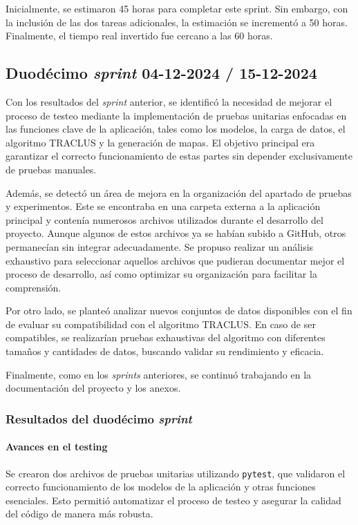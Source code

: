 Inicialmente, se estimaron 45 horas para completar este sprint. Sin embargo, con la inclusión de las dos tareas adicionales, la estimación se incrementó a 50 horas. Finalmente, el tiempo real invertido fue cercano a las 60 horas.


\subsection{Duodécimo \textit{sprint} 04-12-2024 / 15-12-2024}

Con los resultados del \textit{sprint} anterior, se identificó la necesidad de mejorar el proceso de testeo mediante la implementación de pruebas unitarias enfocadas en las funciones clave de la aplicación, tales como los modelos, la carga de datos, el algoritmo TRACLUS y la generación de mapas. El objetivo principal era garantizar el correcto funcionamiento de estas partes sin depender exclusivamente de pruebas manuales.

Además, se detectó un área de mejora en la organización del apartado de pruebas y experimentos. Este se encontraba en una carpeta externa a la aplicación principal y contenía numerosos archivos utilizados durante el desarrollo del proyecto. Aunque algunos de estos archivos ya se habían subido a GitHub, otros permanecían sin integrar adecuadamente. Se propuso realizar un análisis exhaustivo para seleccionar aquellos archivos que pudieran documentar mejor el proceso de desarrollo, así como optimizar su organización para facilitar la comprensión.

Por otro lado, se planteó analizar nuevos conjuntos de datos disponibles con el fin de evaluar su compatibilidad con el algoritmo TRACLUS. En caso de ser compatibles, se realizarían pruebas exhaustivas del algoritmo con diferentes tamaños y cantidades de datos, buscando validar su rendimiento y eficacia.

Finalmente, como en los \textit{sprints} anteriores, se continuó trabajando en la documentación del proyecto y los anexos.

\subsubsection{Resultados del duodécimo \textit{sprint}}

\paragraph{Avances en el testing}
Se crearon dos archivos de pruebas unitarias utilizando \texttt{pytest}, que validaron el correcto funcionamiento de los modelos de la aplicación y otras funciones esenciales. Esto permitió automatizar el proceso de testeo y asegurar la calidad del código de manera más robusta.

